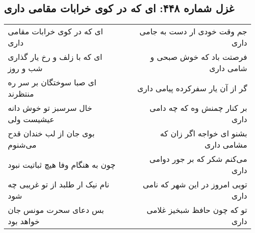 \begin{center}
\section*{غزل شماره ۴۴۸: ای که در کوی خرابات مقامی داری}
\label{sec:sh448}
\begin{longtable}{l p{0.5cm} r}
ای که در کوی خرابات مقامی داری
&&
جم وقت خودی ار دست به جامی داری
\\
ای که با زلف و رخ یار گذاری شب و روز
&&
فرصتت باد که خوش صبحی و شامی داری
\\
ای صبا سوختگان بر سر ره منتظرند
&&
گر از آن یار سفرکرده پیامی داری
\\
خال سرسبز تو خوش دانه عیشیست ولی
&&
بر کنار چمنش وه که چه دامی داری
\\
بوی جان از لب خندان قدح می‌شنوم
&&
بشنو ای خواجه اگر زان که مشامی داری
\\
چون به هنگام وفا هیچ ثباتیت نبود
&&
می‌کنم شکر که بر جور دوامی داری
\\
نام نیک ار طلبد از تو غریبی چه شود
&&
تویی امروز در این شهر که نامی داری
\\
بس دعای سحرت مونس جان خواهد بود
&&
تو که چون حافظ شبخیز غلامی داری
\\
\end{longtable}
\end{center}

